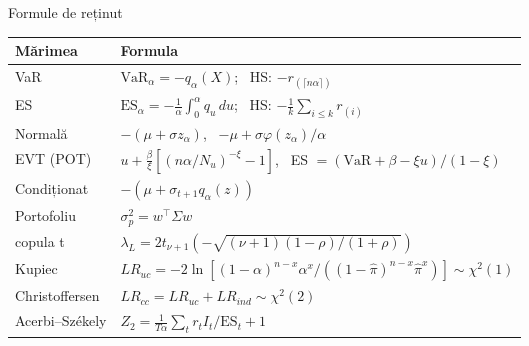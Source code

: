 \begin{frame}{Formule de reținut}
\itemsize{\small}
{\renewcommand{\arraystretch}{1.45}\begin{center}
\small
\begin{tabular}{ll}
\toprule
\textbf{Mărimea} & \textbf{Formula} \\
\midrule
VaR & $\mathrm{VaR}_\alpha = -q_\alpha(X)$; \ HS: $-r_{(\lceil n\alpha\rceil)}$ \\
ES & $\mathrm{ES}_\alpha = -\frac{1}{\alpha}\int_0^\alpha q_u\,du$; \ HS: $-\frac1k\sum_{i \le k} r_{(i)}$ \\
Normală & $-(\mu + \sigma z_\alpha)$, \ $-\mu + \sigma\varphi(z_\alpha)/\alpha$ \\
EVT (POT) & $u + \frac{\beta}{\xi}[(n\alpha/N_u)^{-\xi} - 1]$, \ ES $= (\mathrm{VaR} + \beta - \xi u)/(1 - \xi)$ \\
Condiționat & $-(\mu + \sigma_{t+1}q_\alpha(z))$ \\
Portofoliu & $\sigma_p^2 = w^\top\Sigma w$ \\
copula t & $\lambda_L = 2t_{\nu+1}(-\sqrt{(\nu + 1)(1 - \rho)/(1 + \rho)})$ \\
Kupiec & $LR_{uc} = -2\ln[(1-\alpha)^{n-x}\alpha^x/((1-\hat\pi)^{n-x}\hat\pi^x)] \sim \chi^2(1)$ \\
Christoffersen & $LR_{cc} = LR_{uc} + LR_{ind} \sim \chi^2(2)$ \\
Acerbi--Székely & $Z_2 = \frac{1}{T\alpha}\sum_t r_tI_t/\mathrm{ES}_t + 1$ \\
\bottomrule
\end{tabular}
\end{center}
}
\end{frame}

